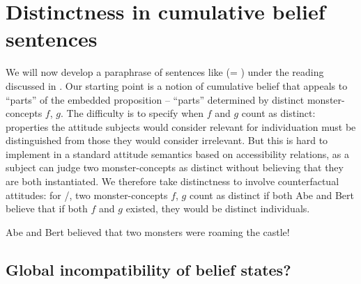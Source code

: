 \documentclass[output=paper]{langscibook}
\begin{document}
\section{Distinctness in cumulative belief sentences}\label{sch-has:sec:3}

We will now develop a paraphrase of sentences like  (= ) under the reading discussed in . Our starting point is a notion of cumulative belief that appeals to ``parts'' of the embedded proposition -- ``parts'' determined by distinct monster-concepts $f$, $g$. The difficulty is to specify when $f$ and $g$ count as distinct: properties the attitude subjects would consider relevant for individuation must be distinguished from those they would consider irrelevant. But this is hard to implement in a standard attitude semantics based on accessibility relations, as a subject can judge two monster-concepts as distinct without believing that they are both instantiated. We therefore take distinctness to involve counterfactual attitudes: for /, two monster-concepts $f$, $g$ count as distinct if both Abe and Bert believe that if both $f$ and $g$ existed, they would be distinct individuals.

\ea \label{sch-has:ex:19} Abe and Bert  believed that two monsters were roaming the castle! \z  %


\subsection{Global incompatibility of belief states?}\label{sch-has:sec:3.1}
\end{document}
